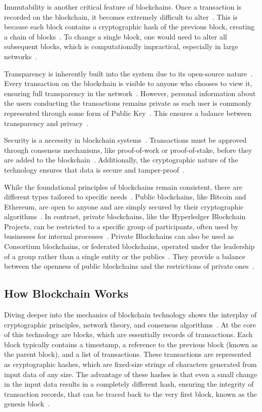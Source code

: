 Immutability is another critical feature of blockchains. Once a transaction is recorded on the blockchain, it becomes extremely difficult to alter~\cite{Pilkington.}. This is because each block contains a cryptographic hash of the previous block, creating a chain of blocks~\cite{Pilkington.}. To change a single block, one would need to alter all subsequent blocks, which is computationally impractical, especially in large networks~\cite{ContedeLeon.2017}.

Transparency is inherently built into the system due to its open-source nature~\cite{Banupriya.2021}. Every transaction on the blockchain is visible to anyone who chooses to view it, ensuring full transparency in the network~\cite{Banupriya.2021}. However, personal information about the users conducting the transactions remains private as each user is commonly represented through some form of Public Key~\cite{Wei.2022}. This ensures a balance between transparency and privacy~\cite{Wei.2022}.

Security is a necessity in blockchain systems~\cite{Nguyen.2019}. Transactions must be approved through consensus mechanisms, like proof-of-work or proof-of-stake, before they are added to the blockchain~\cite{Nguyen.2019}. Additionally, the cryptographic nature of the technology ensures that data is secure and tamper-proof~\cite{Akbar.2021}.

While the foundational principles of blockchains remain consistent, there are different types tailored to specific needs~\cite{Ghosh.2021}. Public blockchains, like Bitcoin and Ethereum, are open to anyone and are simply secured by their cryptographic algorithms~\cite{Ghosh.2021}. In contrast, private blockchains, like the Hyperledger Blockchain Projects, can be restricted to a specific group of participants, often used by businesses for internal processes~\cite{Lu.2023}. Private Blockchains can also be used as Consortium blockchains, or federated blockchains, operated under the leadership of a group rather than a single entity or the publics~\cite{Lu.2023}. They provide a balance between the openness of public blockchains and the restrictions of private ones~\cite{Lu.2023}.

\subsection{How Blockchain Works}
Diving deeper into the mechanics of blockchain technology shows the interplay of cryptographic principles, network theory, and consensus algorithms~\cite{Xiong.2022}. At the core of this technology are blocks, which are essentially records of transactions. Each block typically contains a timestamp, a reference to the previous block (known as the parent block), and a list of transactions. These transactions are represented as cryptographic hashes, which are fixed-size strings of characters generated from input data of any size. The advantage of these hashes is that even a small change in the input data results in a completely different hash, ensuring the integrity of transaction records, that can be traced back to the very first block, known as the genesis block~\cite{Xiong.2022}.

